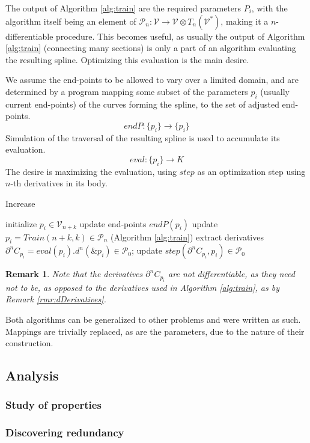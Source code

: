 \documentclass{article}
\newcommand{\VV}{\mathcal{V}}
\newcommand{\dP}{\mathcal{P}}
\newcommand{\D}{\partial}
\newtheorem{opomba}{Remark}[section]
\begin{document}
The output of Algorithm \ref{alg:train} are the required parameters $P_i$, with the algorithm itself being an element of $\dP_{n}:\VV\to\VV\otimes T_{n}(\VV^*)$, making it a $n$-differentiable procedure. This becomes useful, as usually the output of Algorithm \ref{alg:train} (connecting many sections) is only a part of an algorithm evaluating the resulting spline. Optimizing this evaluation is the main desire.

We assume the end-points to be allowed to vary over a limited domain, and are determined by a program mapping some subset of the parameters $p_i$ (usually current end-points) of the curves forming the spline, to the set of adjusted end-points.
\begin{equation}
endP:\{p_i\}\to\{p_i\}
\end{equation}
Simulation of the traversal of the resulting spline is used to accumulate its evaluation.
\begin{equation}
eval:\{p_i\}\to K
\end{equation}
The desire is maximizing the evaluation, using $step$ as an optimization step using $n$-th derivatives in its body.

 \begin{algorithm}[H]
   \caption{Increase}
   \label{alg:Increase}
   \begin{algorithmic}[1]
   \State initialize $p_i\in\VV_{n+k}$
   \State update end-points $endP(p_i)$
   \State update $p_i=Train(n+k,k)\in\dP_{n}$ (Algorithm \ref{alg:train})
   \State extract derivatives $\D^n C_{p_i}=eval(p_i).d^n(\&p_i)\in\dP_{0}$;
   \State update $step(\D^n C_{p_i},p_i)\in\dP_0$
   \EndFor
   \EndProcedure
   \end{algorithmic}
   \end{algorithm}
   \begin{opomba}
   Note that the derivatives $\D^n C_{p_i}$ are not differentiable, as they need not to be, as opposed to the derivatives used in Algorithm \ref{alg:train}, as by Remark \ref{rmr:dDerivatives}.
   \end{opomba}
Both algorithms can be generalized to other problems and were written as such. Mappings are trivially replaced, as are the parameters, due to the nature of their construction.

\subsection{Analysis}
\subsubsection{Study of properties}
\subsubsection{Discovering redundancy}

\clearpage
  \printbibliography
  
\end{document}
